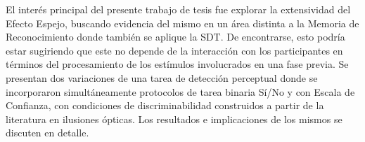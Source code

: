 El interés principal del presente trabajo de tesis fue explorar la extensividad del Efecto Espejo, buscando evidencia del mismo en un área distinta a la Memoria de Reconocimiento donde también se aplique la SDT. De encontrarse, esto podría estar sugiriendo que este no depende de la interacción con los participantes en términos del procesamiento de los estímulos involucrados en una fase previa. Se presentan dos variaciones de una tarea de detección perceptual donde se incorporaron simultáneamente protocolos de tarea binaria Sí/No y con Escala de Confianza, con condiciones de discriminabilidad construidos a partir de la literatura en ilusiones ópticas. Los resultados e implicaciones de los mismos se discuten en detalle.\\